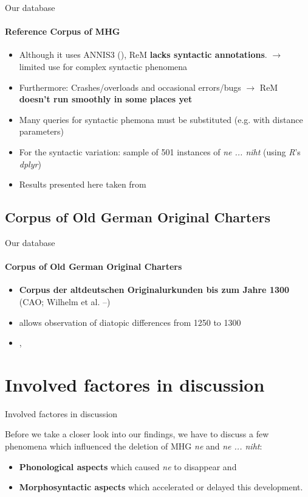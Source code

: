 \documentclass[xcolor=table, compress, %
handout
]{beamer}
\begin{document}
\begin{frame}{Our database}
\framesubtitle{Reference Corpus of MHG}

    \begin{itemize}
        \item Although it uses ANNIS3 (\citealt{Krause2016}), ReM  \textbf{lacks syntactic annotations}. $\rightarrow$ limited use for complex syntactic phenomena
        \item Furthermore: Crashes/overloads and occasional errors/bugs $\rightarrow$ ReM \textbf{doesn't run smoothly in some places yet}
        \item Many queries for syntactic phemona must be substituted (e.g. with distance parameters)
        \item For the syntactic variation: sample of 501 instances of \textit{ne ... niht} (using \textit{R}'s \textit{dplyr})
        \item Results presented here taken from \citet{hrbek21}
    \end{itemize}

\end{frame}

\subsection{Corpus of Old German Original Charters}
\begin{frame}{Our database}
\framesubtitle{Corpus of Old German Original Charters}

\begin{itemize}
   \item \textbf{Corpus der altdeutschen Originalurkunden bis zum Jahre 1300} (CAO; Wilhelm et al. \citeyear{cao1}–\citeyear{cao5})
    \item allows observation of diatopic differences from  1250 to 1300
    \item \citet{beckerschallert21,beckerschallert22a,beckerschallert22b}, \citet{HertelimErscheinen}
\end{itemize}

\end{frame}

\section{Involved factores in discussion}
\begin{frame}{Involved factores in discussion}

Before we take a closer look into our findings, we have to discuss a few phenomena which influenced the deletion of MHG \textit{ne} and \textit{ne ... niht}:

\begin{itemize}
    \item \textbf{Phonological aspects} which caused \textit{ne} to disappear and
    \item \textbf{Morphosyntactic aspects} which accelerated or delayed this development.
\end{itemize}

\end{frame}
\end{document}
